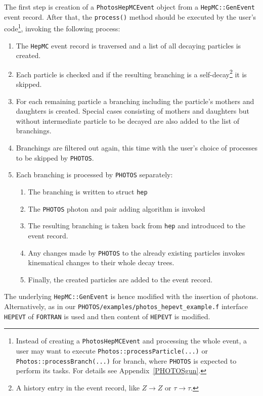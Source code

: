 \documentclass[]{Photos_interface_design}
\begin{document}
The first step is creation of a {\tt PhotosHepMCEvent} object from
a {\tt HepMC::GenEvent} event record. After that, the {\tt process()} method should
be executed by the user's code\footnote{Instead of creating a {\tt PhotosHepMCEvent} and processing the whole event,
a user may want to execute {\tt Photos::processParticle(...)} or {\tt Photos::processBranch(...)}
for branch, where {\tt PHOTOS} is expected to perform its tasks.
For details see Appendix~\ref{PHOTOSgun}.
}, invoking the following process:

\begin{enumerate}
\item The {\tt HepMC} event record is traversed and a list of all decaying
      particles is created.
\item Each particle is checked and if the resulting branching is a self-decay\footnote{A history entry in the event record, like
      $Z\to Z$ or $\tau \to \tau$.} it is skipped.
\item For each remaining particle a branching  including the particle's mothers and daughters
      is created. Special cases consisting of mothers and daughters but without  intermediate particle 
to be decayed are also added to the 
	  list of branchings.
\item Branchings are filtered out again, this time with  the user's choice of processes
      to be skipped by {\tt PHOTOS}.
\item Each branching  is processed by {\tt PHOTOS} separately:

	\begin{enumerate}
  
	\item The branching is written to struct {\tt hep}
	\item The {\tt PHOTOS} photon and pair adding algorithm is invoked 
	\item The resulting branching is taken back from {\tt hep} and introduced to the event record.
	\item Any changes made by {\tt PHOTOS} to the already existing particles
          invokes kinematical changes to their whole decay trees.
	\item Finally, the created particles are added to the event record.
	\end{enumerate}

\end{enumerate}

The underlying {\tt HepMC::GenEvent} is hence modified with the  insertion of photons.
Alternatively, as in our {\tt PHOTOS/examples/photos\_hepevt\_example.f} interface {\tt HEPEVT} of {\tt FORTRAN} is used 
and then content of  {\tt HEPEVT} is modified.
\end{document}
